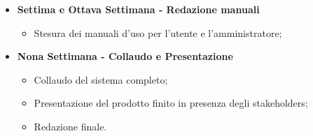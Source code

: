 {\begin{itemize}
\begin{itemize}
            \item Test e verifica dei bug e finalizzazione;
        \end{itemize}
        \item \textbf{Settima e Ottava Settimana - Redazione manuali} 
        \begin{itemize}
            \item Stesura dei manuali d'uso per l'utente e l'amministratore;
        \end{itemize}
        \item \textbf{Nona Settimana - Collaudo e Presentazione} 
        \begin{itemize}
            \item Collaudo del sistema completo;
            \item Presentazione del prodotto finito in presenza degli stakeholders;
            \item Redazione finale.
        \end{itemize}
    \end{itemize}
}

\newcommand{\totaleOre}{308}

\newcommand{\obiettiviObbligatori}{
	 \item \underline{\textit{O01}}: Integrazione di un sistema completo per l'apertura di serrature con lettura di codice a barre e NFC;
	 \item \underline{\textit{O02}}: Realizzazione della piattaforma web per la gestione degli accessi;
	 \item \underline{\textit{O03}}: Creazione del modello 3D dell'involucro e sua realizzazione con stampa 3D;
	 \item \underline{\textit{O04}}: Redazione della manualistica completa;
	 
}

\newcommand{\obiettiviDesiderabili}{
	 \item \underline{\textit{D01}}: Cura e definizione dell'interfaccia grafica della piattaforma web;
	 \item \underline{\textit{D02}}: Ottimizzazione del sistema esistente in termini di efficienza e prestazioni;
}

\newcommand{\obiettiviFacoltativi}{
	 \item \underline{\textit{F01}}: Creazione di un modello 3D modulare espandibile per future versioni;
}